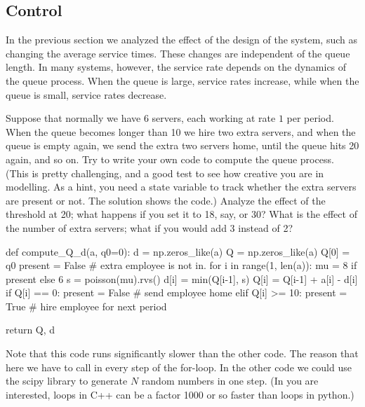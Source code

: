 \documentclass{scrartcl}
\begin{document}
\subsection{Control }
\label{sec:control-}

In the previous section we analyzed the effect of the design of the system, such as changing the average service times. These changes are independent of the queue length. In many systems, however, the service rate depends on the dynamics of the queue process. When the queue is large, service rates increase, while when the queue is small, service rates decrease. 

\begin{exercise}
  Suppose that normally we have 6 servers, each working at rate $1$ per period. When the queue becomes longer than 10 we hire two extra servers, and when the queue is empty again, we send the extra two servers home, until the queue hits 20 again, and so on. Try to write your own code to compute the queue process. (This is pretty challenging, and a good test to see how creative you are in modelling. As a hint, you need a state variable to track whether the extra servers are present or not. The solution shows the code.) Analyze the effect of the threshold at 20; what happens if you set it to 18, say, or 30? What is the effect of the number of extra servers; what if you would add 3 instead of 2?
  

  \begin{solution}
    \begin{pyverbatim}
def compute_Q_d(a, q0=0):
    d = np.zeros_like(a)
    Q = np.zeros_like(a)
    Q[0] = q0
    present = False # extra employee is not in.
    for i in range(1, len(a)):
        mu = 8 if present else 6
        s = poisson(mu).rvs()
        d[i] = min(Q[i-1], s)
        Q[i] = Q[i-1] + a[i] - d[i]
        if Q[i] == 0:
            present = False # send employee home
        elif Q[i] >= 10:
            present = True # hire employee for next period

    return Q, d
    
    \end{pyverbatim}



Note that this code runs significantly slower than the other code. The reason that here we have to call  in every step of the for-loop. In the other code we could use the scipy library to generate $N$ random numbers in one step. (In you are interested, loops in C++ can be a factor 1000 or so faster than loops in python.)
  \end{solution}
  
\end{exercise}
\end{document}
